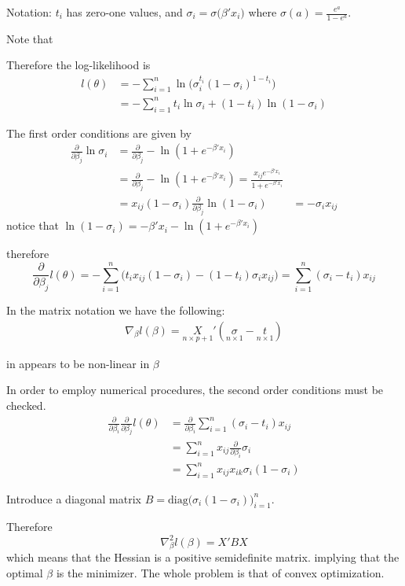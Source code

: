 \documentclass[a4paper]{article}
\begin{document}
Notation: $t_i$ has zero-one values, and $\sigma_i = \sigma\big(\beta'x_i\big)$ where $\sigma(a) = \frac{e^a}{1-e^a}$.

Note that 

Therefore the log-likelihood is 
\begin{align*}
	l(\theta) &= - \sum_{i=1}^n \ln \big( \sigma_i^{t_i} (1-\sigma_i)^{1-t_i} \big) \\
	&= - \sum_{i=1}^n t_i\ln \sigma_i + (1-t_i)\ln (1-\sigma_i)
\end{align*}

The first order conditions are given by
\begin{align*}
	\frac{\partial}{\partial \beta_j}\ln \sigma_i & = \frac{\partial}{\partial \beta_j}-\ln ( 1 + e^{-\beta'x_i} ) \\  
	& = \frac{\partial}{\partial \beta_j} -\ln ( 1 + e^{-\beta'x_i} ) = \frac{x_{ij}e^{-\beta'x_i}}{1 + e^{-\beta'x_i}} \\
	& = x_{ij} (1-\sigma_i)
	\frac{\partial}{\partial \beta_j}\ln (1-\sigma_i) & = - \sigma_i x_{ij}
\end{align*}
notice that $\ln(1-\sigma_i) = -\beta'x_i - \ln(1 + e^{-\beta'x_i})$

therefore
\[\frac{\partial}{\partial \beta_j} l(\theta) = -\sum_{i=1}^n \big( t_i x_{ij} (1-\sigma_i) - (1-t_i)\sigma_i x_{ij} \big) = \sum_{i=1}^n (\sigma_i-t_i)x_{ij} \]

In the matrix notation we have the following:
\begin{align*}
	\nabla_\beta l(\beta) = \underset{n\times p+1}{X}' (\underset{n\times 1}{\sigma} - \underset{n\times 1}{t})
\end{align*}

in appears to be non-linear in $\beta$

In order to employ numerical procedures, the second order conditions must be checked.
\begin{align*}
	\frac{\partial}{\partial \beta_i}\frac{\partial}{\partial \beta_j} l(\theta)
	&= \frac{\partial}{\partial \beta_i} \sum_{i=1}^n (\sigma_i-t_i)x_{ij} \\
	&= \sum_{i=1}^n x_{ij}\frac{\partial}{\partial \beta_i} \sigma_i \\
	&= \sum_{i=1}^n x_{ij} x_{ik} \sigma_i (1 - \sigma_i)
\end{align*}

Introduce a diagonal matrix $B = \text{diag}\big(\sigma_i(1-\sigma_i)\big)_{i=1}^n$.

Therefore
\[\nabla_\beta^2 l(\beta) = X'BX\]
which means that the Hessian is a positive semidefinite matrix.
implying that the optimal $\beta$ is the minimizer. The whole problem is that of convex optimization.
\end{document}

